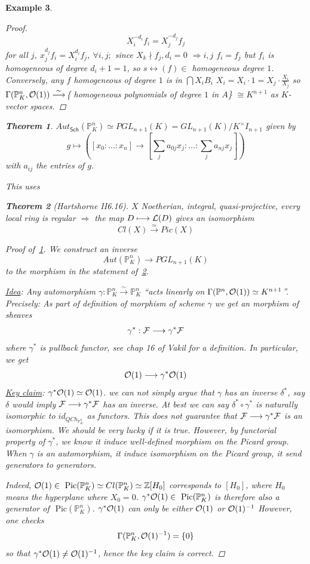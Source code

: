 \documentclass[11pt]{article}
\newtheorem{thm}{Theorem}[section]
\newtheorem{ex}[thm]{Example}
\newcommand{\pic}{\text{ Pic}}
\newcommand{\proj}{\mathbb P}
\newcommand{\intg}{\mathbb Z}
\newcommand{\calf}{{\cal F}}
\newcommand{\call}{{\cal L}}
\newcommand{\calo}{{\cal O}}
\newcommand{\Lrta}{\Longrightarrow}
\newcommand{\lrta}{\longrightarrow}
\newcommand{\llrta}{\longleftrightarrow}
\begin{document}
\begin{ex}
\begin{enumerate}[label=\boxed{\arabic*}]
\begin{proof}
 $$
 X_i^{-d_i}f_i=X_j^{-d_j}f_j
 $$
 for all $j$,
 $x_j^{d_j} f_i=X_i^{d_i}f_j$, $\forall i,j;$ since $X_k\nmid f_j, d_i=0$ $\Lrta i,j$ $f_i=f_j$ but $f_i$ is homogeneous of degree $d_{i}+1=1$, so $s\llrta (f)\in$ homogeneous degree $1$. Conversely, any $f$ homogeneous of degree $1$ is in $\bigcap X_i B_i$ $X_i=X_i\cdot 1=X_j\cdot \frac{X_i}{X_j}$ so $\Gamma(\proj^n_K,\calo(1))\overset{\sim}{\lrta}$\{ homogeneous polynomials of degree $1$ in $A$\} $\cong K^{n+1}$ as $K$-vector spaces. 
 \end{proof}
\begin{thm}\label{thm:aut_Proj}
$Aut_{\mathsf{Sch}}(\proj^n_K)\simeq PGL_{n+1}(K)=GL_{n+1}(K)/K^\times I_{n+1}$ given by
$$
g\longmapsto ([x_0:...:x_n]\lrta[\sum_j a_{0j}x_j:...:\sum_j a_{nj} x_j]) 
$$
with $a_{ij}$ the entries of $g$.  
\end{thm}
This uses
\begin{thm}[Hartshorne II6.16]
\label{thm:Hart_II_6.16}$X$ Noetherian, integral, quasi-projective, every local ring is regular
$\Lrta$ the map $D\longmapsto \call(D)$ gives an isomorphism 
$$
Cl(X)\overset{\simeq}{\lrta}Pic(X)
$$
\begin{proof}[Proof of~\ref{thm:aut_Proj}]
We construct an inverse
$$
Aut(\proj^n_K)\lrta PGL_{n+1}(K)
$$
to the morphism in the statement of~\ref{thm:Hart_II_6.16}. 

\underline{Idea}: Any automorphism $\gamma:\proj^n_K\overset{\sim}{\lrta}\proj^n_K$ ``acts linearly on $\Gamma(\proj^n,\calo(1))\simeq K^{n+1}$''. Precisely: As part of definition of morphism of scheme $\gamma$ we get an morphism of sheaves
$$
\gamma^*:\calf\lrta \gamma^*\calf
$$
where $\gamma^*$ is pullback functor, see chap 16 of Vakil for a definition.
In particular, we get 
$$
\calo(1)\lrta\gamma^*\calo(1)
$$
\underline{Key claim}: $\gamma^*\calo(1)\simeq \calo(1)$. {\color{red} we can not simply argue that $\gamma$ has an inverse $\delta^*$, say $\delta$ would imply $\calf\lrta\gamma^*\calf$ has an inverse. At best we can say $\delta^*\circ\gamma^*$ is naturally isomorphic to $id_{QCh_{\proj^n_K}}$ as functors. This does not guarantee that $\calf\lrta\gamma^*\calf$ is an isomorphism. We should be very lucky if it is true.} 
However, by functorial property of $\gamma^*$, we know it induce well-defined morphism on the Picard group. When $\gamma$ is an automorphism, it induce isomorphism on the Picard group, it send generators to generators.

Indeed, $\calo(1)\in \pic(\proj^n_K)\simeq Cl(\proj^n_K)\simeq \intg[H_0]$ corresponds to $[H_0]$, where $H_0$ means the hyperplane where $X_0=0$.
$\gamma^*\calo(1)\in \pic(\proj^n_K)$ is therefore also a generator of $\pic(\proj^n_K)$. $\gamma^*\calo(1)$ can only be either $\calo(1)$ or $\calo(1)^{-1}$ However, one checks 
$$
\Gamma(\proj^n_K,\calo(1)^{-1})=\{0\}
$$
so that  $\gamma^*\calo(1)\neq \calo(1)^{-1}$, hence the key claim is correct.


\end{proof}
\end{thm}
\end{enumerate}
\end{ex}
\end{document}
